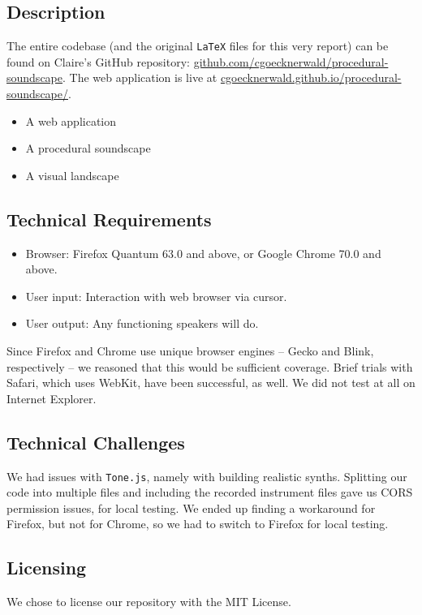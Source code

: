 \documentclass[12pt,a4paper]{article}
\newcommand{\code}{\texttt}
\newcommand{\lightcode}[1]{\colorbox{light-gray}{\texttt{#1}}}
\begin{document}
\subsection{Description}

The entire codebase (and the original \code{LaTeX} files for this very report) can be found on Claire's GitHub repository: \href{https://github.com/cgoecknerwald/procedural-soundscape}{github.com/cgoecknerwald/procedural-soundscape}. The web application is live at \href{https://cgoecknerwald.github.io/procedural-soundscape/}{cgoecknerwald.github.io/procedural-soundscape/}.

\begin{itemize}
	\item A web application
	\item A procedural soundscape
	\item A visual landscape
\end{itemize}

\subsection{Technical Requirements}
\begin{itemize}
	\item Browser: Firefox Quantum 63.0 and above, or Google Chrome 70.0 and above.
	\item User input: Interaction with web browser via cursor.
	\item User output: Any functioning speakers will do.
\end{itemize}

Since Firefox and Chrome use unique browser engines -- Gecko and Blink, respectively -- we reasoned that this would be sufficient coverage. Brief trials with Safari, which uses WebKit, have been successful, as well. We did not test at all on Internet Explorer.

\subsection{Technical Challenges}
We had issues with \lightcode{Tone.js}, namely with building realistic synths. Splitting our code into multiple files and including the recorded instrument files gave us CORS permission issues, for local testing. We ended up finding a workaround for Firefox, but not for Chrome, so we had to switch to Firefox for local testing.

\subsection{Licensing}
We chose to license our repository with the MIT License.
\end{document}
